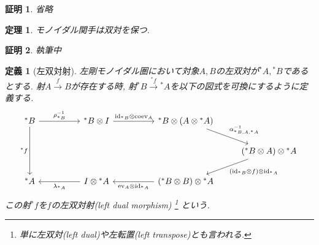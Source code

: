 \documentclass[a4paper,12pt]{ltjsarticle}
\theoremstyle{break}
\newtheorem{defn}[thm]{定義}
\newtheorem{lem}[thm]{補題}
\newtheorem{thrm}[thm]{定理}
\newtheorem*{prf}{証明}
\newcommand{\xr}[1]{\xrightarrow{#1}}
\newcommand{\id}{\mathrm{id}}
\newcommand{\eva}{\mathrm{ev}}
\newcommand{\coev}{\mathrm{coev}}
\newcommand{\al}{\alpha}
\newcommand{\la}{\lambda}
\newcommand{\ve}{\varepsilon}
\newcommand{\dav}{\dashv}
\newcommand{\ot}{\otimes}
\numberwithin{equation}{section}
\begin{document}
\begin{prf}
  省略
\end{prf}

\begin{thrm}
  モノイダル関手は双対を保つ. 
\end{thrm}

\begin{prf}
  執筆中
\end{prf}





\begin{defn}[左双対射]
  左剛モノイダル圏において対象$A,B$の左双対が${}^*A,{}^*B$であるとする. 
  射$A \xr{f} B$が存在する時, 射${}^*B \xr{{}^*f} {}^*A$を以下の図式を可換にするように定義する.
  \[\begin{tikzcd}
    {{}^*B} && {{}^*B \ot I} && {{}^*B \ot (A \ot {}^*A)} \\
    &&&&& {({}^*B \ot A) \ot {}^*A} \\
    {{}^*A} && {I \ot {}^*A} && {({}^*B \ot B) \ot {}^*A}
    \arrow["{\rho_{{}^*B}^{-1}}", from=1-1, to=1-3]
    \arrow["{\id_{{}^*B} \ot \coev_A}", from=1-3, to=1-5]
    \arrow["{\al_{{}^*B,A,{}^*A}^{-1}}", from=1-5, to=2-6]
    \arrow["{(\id_{{}^*B} \ot f) \ot \id_{{}^*A}}", from=2-6, to=3-5]
    \arrow["{\eva_A \ot \id_{{}^*A}}", from=3-5, to=3-3]
    \arrow["{\la_{{}^*A}}", from=3-3, to=3-1]
    \arrow["{{}^*f}"', from=1-1, to=3-1]
  \end{tikzcd}\]
  この射${}^*f$を$f$の左双対射(left dual morphism)
  \footnote{
    単に左双対(left dual)や左転置(left transpose)とも言われる. 
  }
  という. 
\end{defn}
\end{document}
